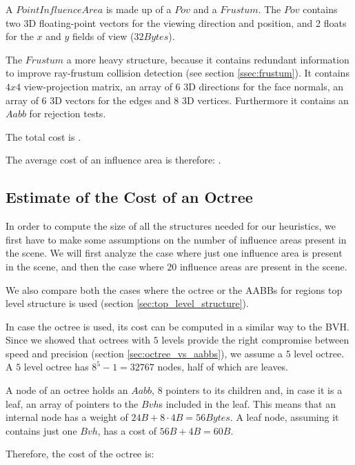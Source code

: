 \documentclass{PoliMi_MasterThesis}
\begin{document}
A $PointInfluenceArea$ is made up of a $Pov$ and a $Frustum$. The $Pov$ contains two 3D floating-point vectors for the viewing direction and position, and 2 floats for the $x$ and $y$ fields of view ($32 Bytes$).

The $Frustum$ a more heavy structure, because it contains redundant information to improve ray-frustum collision detection (see section \ref{ssec:frustum}). It contains $4x4$ view-projection matrix, an array of $6$ 3D directions for the face normals, an array of $6$ 3D vectors for the edges and $8$ 3D vertices. Furthermore it contains an $Aabb$ for rejection tests. 

The total cost is \unboldmath.

The average cost of an influence area is therefore: \unboldmath.

\subsection*{Estimate of the Cost of an Octree}
In order to compute the size of all the structures needed for our heuristics, we first have to make some assumptions on the number of influence areas present in the scene. We will first analyze the case where just one influence area is present in the scene, and then the case where $20$ influence areas are present in the scene.

We also compare both the cases where the octree or the AABBs for regions top level structure is used (section \ref{sec:top_level_structure}).

In case the octree is used, its cost can be computed in a similar way to the BVH. Since we showed that octrees with $5$ levels provide the right compromise between speed and precision (section \ref{sec:octree_vs_aabbs}), we assume a $5$ level octree. A $5$ level octree has $8^{5}-1 = 32767$ nodes, half of which are leaves.

A node of an octree holds an $Aabb$, $8$ pointers to its children and, in case it is a leaf, an array of pointers to the $Bvh$s included in the leaf. This means that an internal node has a weight of $24B + 8 \cdot 4B = 56 Bytes$. A leaf node, assuming it contains just one $Bvh$, has a cost of $56B + 4B = 60B$.

Therefore, the cost of the octree is: 
\unboldmath
\end{document}

